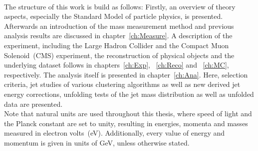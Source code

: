 	\\
	The structure of this work is build as follows: Firstly, an overview of theory aspects, especially the Standard Model of particle physics, is presented. Afterwards an introduction of the mass measurement method and previous analysis results are discussed in chapter~\ref{ch:Measure}. A description of the experiment, including the Large Hadron Collider and the Compact Muon Solenoid~(CMS) experiment, the reconstruction of physical objects and the underlying dataset follows in chapters~\ref{ch:Exp}, ~\ref{ch:Reco} and ~\ref{ch:MC}, respectively. The analysis itself is presented in chapter~\ref{ch:Ana}. Here, selection criteria, jet studies of various clustering algorithms as well as new derived jet energy corrections, unfolding tests of the jet mass distribution as well as unfolded data are presented.
	\\
	Note that natural units are used throughout this thesis, where speed of light and the Planck constant are set to unity, resulting in energies, momenta and masses measured in electron volts~(eV). Additionally, every value of energy and momentum is given in units of GeV, unless otherwise stated.